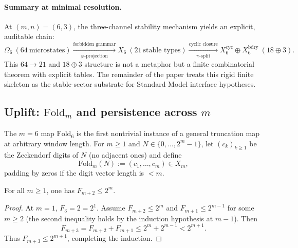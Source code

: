 \paragraph{Summary at minimal resolution.}
At $(m,n)=(6,3)$, the three-channel stability mechanism yields an explicit, auditable chain:
\[
\Omega_6\ (64\ \text{microstates})
\xrightarrow[\text{$\varphi$-projection}]{\text{forbidden grammar}}
X_6\ (21\ \text{stable types})
\xrightarrow[\text{$\pi$-split}]{\text{cyclic closure}}
X_6^{\mathrm{cyc}}\oplus X_6^{\mathrm{bdry}}\ (18\oplus 3).
\]
This $64\to 21$ and $18\oplus 3$ structure is not a metaphor but a finite combinatorial theorem with explicit tables.
The remainder of the paper treats this rigid finite skeleton as the stable-sector substrate for Standard Model interface hypotheses.

\subsection{Uplift: \texorpdfstring{$\mathrm{Fold}_m$}{Foldm} and persistence across \texorpdfstring{$m$}{m}}
\label{subsec:foldm_uplift}

The $m=6$ map $\mathrm{Fold}_6$ is the first nontrivial instance of a general truncation map at arbitrary window length.
For $m\ge 1$ and $N\in\{0,\dots,2^m-1\}$, let $(c_k)_{k\ge 1}$ be the Zeckendorf digits of $N$ (no adjacent ones) and define
\begin{equation}\label{eq:foldm_def}
\mathrm{Fold}_m(N):=(c_1,\dots,c_m)\in X_m,
\end{equation}
padding by zeros if the digit vector length is $<m$.

\begin{lemma}\label{lem:fib_dyadic_bound}
For all $m\ge 1$, one has $F_{m+2}\le 2^m$.
\end{lemma}
\begin{proof}
At $m=1$, $F_3=2=2^1$.
Assume $F_{m+2}\le 2^m$ and $F_{m+1}\le 2^{m-1}$ for some $m\ge 2$ (the second inequality holds by the induction hypothesis at $m-1$).
Then
\[
F_{m+3}=F_{m+2}+F_{m+1}\le 2^m+2^{m-1}<2^{m+1}.
\]
Thus $F_{m+3}\le 2^{m+1}$, completing the induction.
\end{proof}

